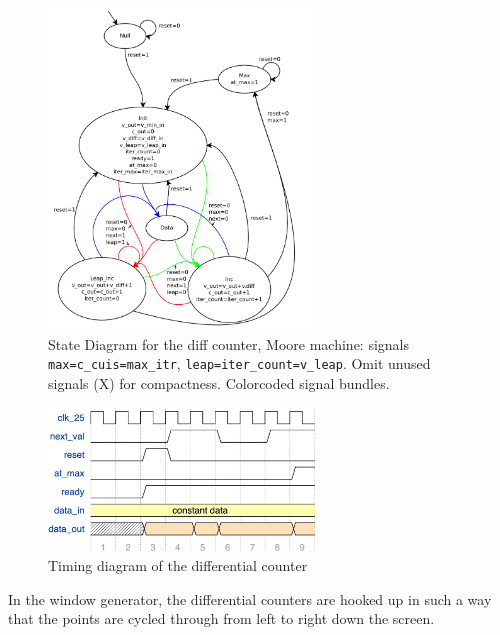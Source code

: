 \documentclass{article}
\begin{document}
\begin{figure}
  \centering
    \includegraphics[width=200pt]{state_diagrams/diff_counter.pdf}
  \caption{State Diagram for the diff counter, Moore machine: signals
    \texttt{max=c\_cuis=max\_itr}, \texttt{leap=iter\_count=v\_leap}. Omit
    unused signals (X) for compactness. Colorcoded signal bundles.}
\end{figure}

\begin{figure}
  \centering
    \includegraphics[width=200pt]{timing_diagrams/diff_counter.pdf}
  \caption{Timing diagram of the differential counter}
\end{figure}

In the window generator, the differential counters are hooked up in such a way that the points are cycled through
from left to right down the screen.
\end{document}
